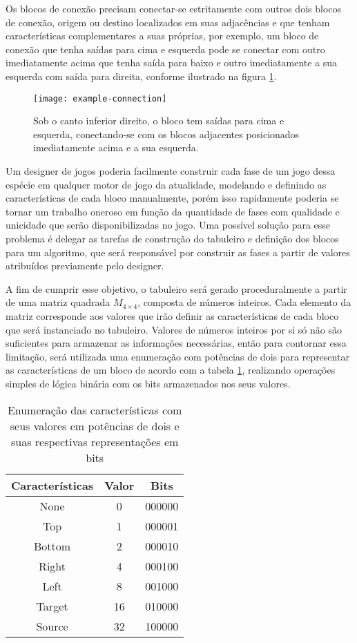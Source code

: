 \documentclass[10pt, conference, compsocconf]{IEEEtran}
\begin{document}
Os blocos de conexão precisam conectar-se estritamente com outros dois blocos de conexão, origem ou destino localizados em suas adjacências e que tenham características complementares a suas próprias, por exemplo, um bloco de conexão que tenha saídas para cima e esquerda pode se conectar com outro imediatamente acima que tenha saída para baixo e outro imediatamente a sua esquerda com saída para direita, conforme ilustrado na figura \ref{fig:example-connection}.

\begin{figure}[h]
    \centering
    \texttt{[image: example-connection]}
    \caption{Sob o canto inferior direito, o bloco tem saídas para cima e esquerda, conectando-se com os blocos adjacentes posicionados imediatamente acima e a sua esquerda.}
    \label{fig:example-connection}
\end{figure}

Um designer de jogos poderia facilmente construir cada fase de um jogo dessa espécie em qualquer motor de jogo da atualidade, modelando e definindo as características de cada bloco manualmente, porém isso rapidamente poderia se tornar um trabalho oneroso em função da quantidade de fases com qualidade e unicidade que serão disponibilizadas no jogo. Uma possível solução para esse problema é delegar as tarefas de construção do tabuleiro e definição dos blocos para um algoritmo, que será responsável por construir as fases a partir de valores atribuídos previamente pelo designer.

A fim de cumprir esse objetivo, o tabuleiro será gerado proceduralmente a partir de uma matriz quadrada $M_{4 \times 4}$, composta de números inteiros. Cada elemento da matriz corresponde aos valores que irão definir as características de cada bloco que será instanciado no tabuleiro. Valores de números inteiros por si só não são suficientes para armazenar as informações necessárias, então para contornar essa limitação, será utilizada uma enumeração com potências de dois para representar as características de um bloco de acordo com a tabela \ref{tab:flagvalues}, realizando operações simples de lógica binária com os bits armazenados nos seus valores.

\begin{table}[ht]
    \centering
    \begin{tabular}{|c|c|c|}
    \hline
    Características & Valor & Bits\\
    \hline
    \hline
    None & 0 & 000000\\
    \hline
    Top & 1 & 000001\\
    \hline
    Bottom & 2 & 000010\\
    \hline
    Right & 4 & 000100\\
    \hline
    Left & 8 & 001000\\
    \hline
    Target & 16 & 010000\\
    \hline
    Source & 32 & 100000\\
    \hline
    \end{tabular}
    \caption{Enumeração das características com seus valores em potências de dois e suas respectivas representações em bits}
    \label{tab:flagvalues}
\end{table}
\end{document}
